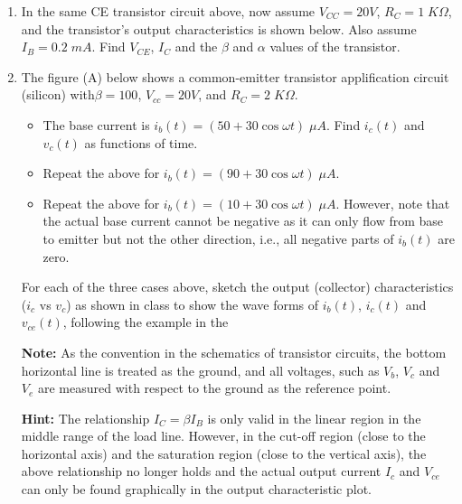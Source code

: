 \begin{enumerate}
\item In the same CE transistor circuit above, now assume $V_{CC}=20V$,
  $R_C=1\;K\Omega$, and the transistor's output characteristics is shown
  below. Also assume $I_B=0.2\;mA$. Find $V_{CE}$, $I_C$ and the $\beta$
  and $\alpha$ values of the transistor.



\item The figure (A) below shows a common-emitter transistor 
applification circuit (silicon) with$\beta=100$, $V_{cc}=20V$, 
and $R_C=2\;K\Omega$. 
\begin{itemize}
\item The base current is $i_b(t)=(50+30 \cos \omega t)\;\mu A$.
Find $i_c(t)$ and $v_c(t)$ as functions of time.
\item Repeat the above for $i_b(t)=(90+30 \cos \omega t)\;\mu A$.
\item Repeat the above for $i_b(t)=(10+30 \cos \omega t)\;\mu A$.
  However, note that the actual base current cannot be negative as 
  it can only flow from base to emitter but not the other direction,
  i.e., all negative parts of $i_b(t)$ are zero.
\end{itemize}
For each of the three cases above, sketch the output (collector) 
characteristics ($i_c$ vs $v_c$) as shown in class to show the wave
forms of $i_b(t)$, $i_c(t)$ and $v_{ce}(t)$, following the example
in the 

{\bf Note:} As the convention in the schematics of transistor circuits,
the bottom horizontal line is treated as the ground, and all voltages,
such as $V_b$, $V_c$ and $V_e$ are measured with respect to the 
ground as the reference point.

{\bf Hint:} The relationship $I_C=\beta I_B$ is only valid in the
linear region in the middle range of the load line. However, in 
the cut-off region (close to the horizontal axis) and the saturation
region (close to the vertical axis), the above relationship no
longer holds and the actual output current $I_c$ and $V_{ce}$ can
only be found graphically in the output characteristic plot.


\end{enumerate}
